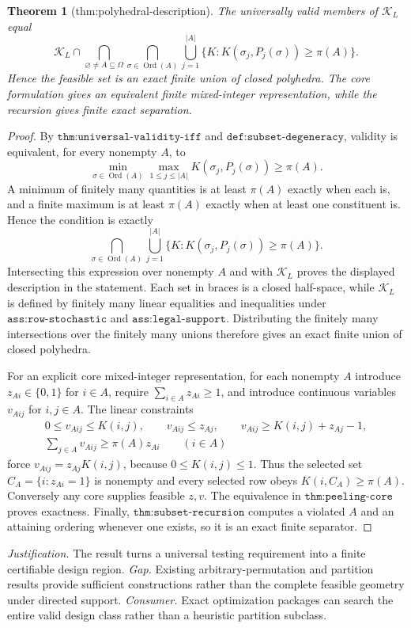 \documentclass{article}
\newtheorem{theorem}{Theorem}
\begin{document}
\begin{theorem}[thm:polyhedral-description]\label{thm:polyhedral-description}
The universally valid members of \(\mathcal{K}_L\) equal \[\mathcal{K}_L\cap\bigcap_{\varnothing\neq A\subseteq\Omega}\bigcap_{\sigma\in\operatorname{Ord}(A)}\bigcup_{j=1}^{|A|}\{K:K(\sigma_j,P_j(\sigma))\geq\pi(A)\}.\] Hence the feasible set is an exact finite union of closed polyhedra. The core formulation gives an equivalent finite mixed-integer representation, while the recursion gives finite exact separation.
\end{theorem}
\begin{proof}
By \(\texttt{thm:universal-validity-iff}\) and
\(\texttt{def:subset-degeneracy}\), validity is equivalent, for every nonempty
\(A\), to
\[
\min_{\sigma\in\operatorname{Ord}(A)}
\max_{1\leq j\leq |A|}K(\sigma_j,P_j(\sigma))\geq\pi(A).
\]
A minimum of finitely many quantities is at least \(\pi(A)\) exactly when each is,
and a finite maximum is at least \(\pi(A)\) exactly when at least one constituent
is.  Hence the condition is exactly
\[
\bigcap_{\sigma\in\operatorname{Ord}(A)}
\bigcup_{j=1}^{|A|}
\{K:K(\sigma_j,P_j(\sigma))\geq\pi(A)\}.
\]
Intersecting this expression over nonempty \(A\) and with
\(\mathcal K_L\) proves the displayed description in the statement.  Each set in
braces is a closed half-space, while \(\mathcal K_L\) is defined by finitely many
linear equalities and inequalities under \(\texttt{ass:row-stochastic}\) and
\(\texttt{ass:legal-support}\).  Distributing the finitely many intersections over
the finitely many unions therefore gives an exact finite union of closed
polyhedra.

For an explicit core mixed-integer representation, for each nonempty \(A\) introduce
\(z_{A i}\in\{0,1\}\) for \(i\in A\), require
\(\sum_{i\in A}z_{A i}\geq1\), and introduce continuous variables
\(v_{Aij}\) for \(i,j\in A\).  The linear constraints
\[
\begin{gathered}
0\leq v_{Aij}\leq K(i,j),\qquad v_{Aij}\leq z_{Aj},\qquad
v_{Aij}\geq K(i,j)+z_{Aj}-1,\\
\sum_{j\in A}v_{Aij}\geq \pi(A)z_{Ai}\qquad(i\in A)
\end{gathered}
\]
force \(v_{Aij}=z_{Aj}K(i,j)\), because \(0\leq K(i,j)\leq1\).  Thus the selected
set \(C_A=\{i:z_{Ai}=1\}\) is nonempty and every selected row obeys
\(K(i,C_A)\geq\pi(A)\).  Conversely any core supplies feasible \(z,v\).  The
equivalence in \(\texttt{thm:peeling-core}\) proves exactness.  Finally,
\(\texttt{thm:subset-recursion}\) computes a violated \(A\) and an attaining
ordering whenever one exists, so it is an exact finite separator.
\end{proof}
\par\smallskip\noindent \textit{Justification.} The result turns a universal testing requirement into a finite certifiable design region. \textit{Gap.} Existing arbitrary-permutation and partition results provide sufficient constructions rather than the complete feasible geometry under directed support. \textit{Consumer.} Exact optimization packages can search the entire valid design class rather than a heuristic partition subclass.
\end{document}
